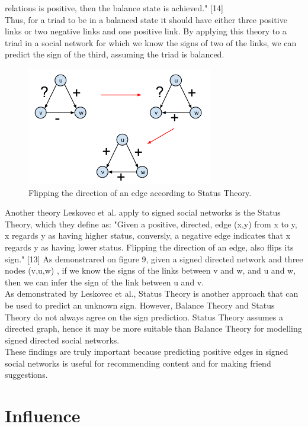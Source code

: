 \documentclass[conference,letterpaper]{IEEEtran}
\begin{document}
relations is positive, then the balance state is achieved." [14] \\
Thus, for a triad to be in a balanced state it should have either three positive links or two negative links
and one positive link. By applying this theory to a triad in a social network for which we know the signs of
two of the links, we can predict the sign of the third, assuming the triad is balanced.\\
\begin{center}
\begin{figure}[hb]
\centering
\includegraphics[width=3.2in]{status_theory}
\caption{
Flipping the direction of an edge according to Status Theory.
}
\label{fig_sim10}
\end{figure}
\end{center}
Another theory Leskovec et al. apply to signed social networks is the Status Theory, which they define as:
"Given a positive, directed, edge (x,y) from x to y, x regards y as having higher status, conversly, a
negative edge indicates that x regards y as having lower status. Flipping the direction of an edge, also
flips its sign." [13] As demonstrared on figure 9, given a signed directed network and three nodes (v,u,w) ,
if we know the signs of the links between v and w, and u and w, then we can infer the sign of the link 
between u and v. \\
As demonstrated by Leskovec et al., Status Theory is another approach that can be used to predict an
unknown sign. However, Balance Theory and Status Theory do not always agree on the sign prediction.
Status Theory assumes a directed graph, hence it may be more suitable than Balance Theory for modelling
signed directed social networks.\\
These findings are truly important because predicting positive edges in signed social networks is useful
for recommending content and for making friend suggestions.\\

\section{Influence}
\end{document}
